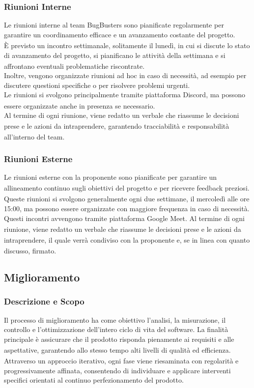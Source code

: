 \documentclass[a4paper,11pt]{article}
\newcommand{\G}{\textsubscript{\scalebox{0.6}{\textbf{G}}}}
\begin{document}
\subsubsection{Riunioni Interne}
Le riunioni interne al team BugBusters sono pianificate regolarmente per garantire un coordinamento efficace e un avanzamento costante del progetto\G{}.\\
È previsto un incontro settimanale, solitamente il lunedì, in cui si discute lo stato di avanzamento del progetto\G{}, si pianificano le attività della settimana e si affrontano eventuali problematiche riscontrate.\\
Inoltre, vengono organizzate riunioni ad hoc in caso di necessità, ad esempio per discutere questioni specifiche o per risolvere problemi urgenti.\\
Le riunioni si svolgono principalmente tramite piattaforma Discord\G{}, ma possono essere organizzate anche in presenza se necessario.\\
Al termine di ogni riunione, viene redatto un verbale\G{} che riassume le decisioni prese e le azioni da intraprendere, garantendo tracciabilità\G{} e responsabilità all'interno del team.

\subsubsection{Riunioni Esterne}
Le riunioni esterne con la proponente\G{} sono pianificate per garantire un allineamento continuo sugli obiettivi del progetto\G{} e per ricevere feedback preziosi.\\
Queste riunioni si svolgono generalmente ogni due settimane, il mercoledì alle ore 15:00, ma possono essere organizzate con maggiore frequenza in caso di necessità.\\
Questi incontri avvengono tramite piattaforma Google Meet\G{}.
Al termine di ogni riunione, viene redatto un verbale\G{} che riassume le decisioni prese e le azioni da intraprendere, il quale verrà condiviso con la proponente\G{} e, se in linea con quanto discusso, firmato.

\subsection{Miglioramento}
\subsubsection{Descrizione e Scopo}
Il processo di miglioramento ha come obiettivo l'analisi, la misurazione, il controllo e l'ottimizzazione dell'intero ciclo di 
vita del software. La finalità principale è assicurare che il prodotto\G{} risponda pienamente ai requisiti e alle aspettative,
garantendo allo stesso tempo alti livelli di qualità\G{} ed efficienza\G{}. \\
Attraverso un approccio iterativo, ogni fase viene 
riesaminata con regolarità e progressivamente affinata, consentendo di individuare e applicare interventi specifici 
orientati al continuo perfezionamento del prodotto\G{}.
\end{document}

